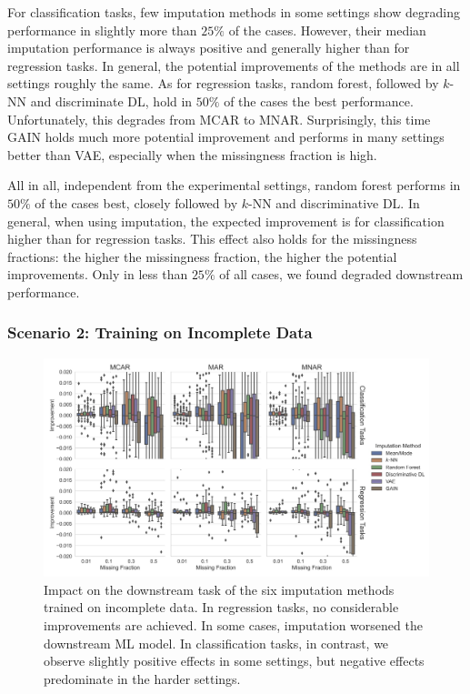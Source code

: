 \documentclass[utf8]{frontiersSCNS} %
\begin{document}
For classification tasks, few imputation methods in some settings show degrading performance in slightly more than $25\%$ of the cases. However, their median imputation performance is always positive and generally higher than for regression tasks. In general, the potential improvements of the methods are in all settings roughly the same. As for regression tasks, random forest, followed by $k$-NN and discriminate DL, hold in $50\%$ of the cases the best performance. Unfortunately, this degrades from MCAR to MNAR. Surprisingly, this time GAIN holds much more potential improvement and performs in many settings better than VAE, especially when the missingness fraction is high.

All in all, independent from the experimental settings, random forest performs in $50\%$ of the cases best, closely followed by $k$-NN and discriminative DL. In general, when using imputation, the expected improvement is for classification higher than for regression tasks. This effect also holds for the missingness fractions: the higher the missingness fraction, the higher the potential improvements. Only in less than $25\%$ of all cases, we found degraded downstream performance.


\subsubsection{Scenario 2: Training on Incomplete Data}

\begin{figure}\centering
	\includegraphics[width=1\columnwidth]{corrupted_downstream_boxplot}

	\caption{Impact on the downstream task of the six imputation methods trained on incomplete data. In regression tasks, no considerable improvements are achieved. In some cases, imputation worsened the downstream ML model. In classification tasks, in contrast, we observe slightly positive effects in some settings, but negative effects predominate in the harder settings.
	}
	\label{fig:corrupted_downstream_boxplot}
\end{figure}
\end{document}
